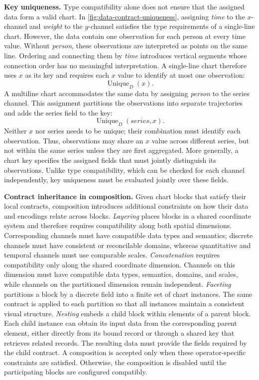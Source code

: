 \textbf{Key uniqueness.}
Type compatibility alone does not ensure that the assigned data form a valid
chart. In \autoref{fig:data-contract-uniqueness}, assigning \emph{time} to
the \(x\)-channel and \emph{weight} to the \(y\)-channel satisfies the type
requirements of a single-line chart. However, the data contain one
observation for each person at every time value. Without \emph{person}, these
observations are interpreted as points on the same line. Ordering and
connecting them by \emph{time} introduces vertical segments whose connection
order has no meaningful interpretation. A single-line chart therefore uses
\(x\) as its key and requires each \(x\) value to identify at most one
observation:
\[
    \operatorname{Unique}_{D}(x).
\]
A multiline chart accommodates the same data by assigning \emph{person} to
the series channel. This assignment partitions the observations into
separate trajectories and adds the series field to the key:
\[
    \operatorname{Unique}_{D}(\mathit{series},x).
\]
Neither \(x\) nor series needs to be unique; their combination must identify
each observation. Thus, observations may share an \(x\) value across
different series, but not within the same series unless they are first
aggregated. More generally, a chart key specifies the assigned fields that
must jointly distinguish its observations. Unlike type compatibility, which
can be checked for each channel independently, key uniqueness must be
evaluated jointly over these fields.

\textbf{Contract inheritance in composition.}
Given chart blocks that satisfy their local contracts, composition introduces
additional constraints on how their data and encodings relate across blocks.
\emph{Layering} places blocks in a shared coordinate system and therefore
requires compatibility along both spatial dimensions. Corresponding channels
must have compatible data types and semantics; discrete channels must have
consistent or reconcilable domains, whereas quantitative and temporal
channels must use comparable scales.
\emph{Concatenation} requires compatibility only along the shared coordinate
dimension. Channels on this dimension must have compatible data types,
semantics, domains, and scales, while channels on the partitioned dimension
remain independent.
\emph{Faceting} partitions a block by a discrete field into a finite set of
chart instances. The same contract is applied to each partition so that all
instances maintain a consistent visual structure.
\emph{Nesting} embeds a child block within elements of a parent block. Each
child instance can obtain its input data from the corresponding parent
element, either directly from its bound record or through a shared key that
retrieves related records. The resulting data must provide the fields required
by the child contract. A composition is accepted only when these operator-specific constraints are
satisfied. Otherwise, the composition is disabled until the participating
blocks are configured compatibly.


